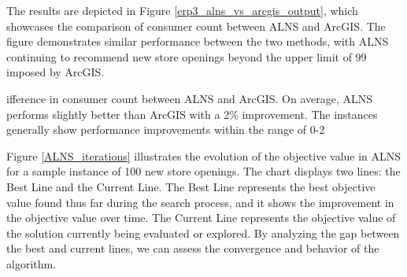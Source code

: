 \documentclass{ecai}
\begin{document}

The results are depicted in Figure \ref{erp3_alns_vs_arcgis_output}, which showcases the comparison of consumer count between ALNS and ArcGIS. The figure demonstrates similar performance between the two methods, with ALNS continuing to recommend new store openings beyond the upper limit of 99 imposed by ArcGIS.


ifference in consumer count between ALNS and ArcGIS. On average, ALNS performs slightly better than ArcGIS with a 2\% improvement. The instances generally show performance improvements within the range of 0-2%



Figure \ref{ALNS_iterations} illustrates the evolution of the objective value in ALNS for a sample instance of 100 new store openings. The chart displays two lines: the Best Line and the Current Line. The Best Line represents the best objective value found thus far during the search process, and it shows the improvement in the objective value over time. The Current Line represents the objective value of the solution currently being evaluated or explored. By analyzing the gap between the best and current lines, we can assess the convergence and behavior of the algorithm.
\end{document}
